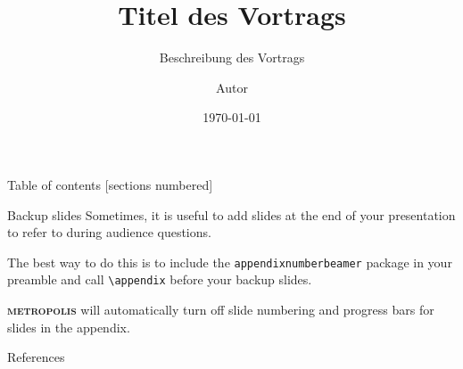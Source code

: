 \documentclass[10pt]{beamer}
\title{Titel des Vortrags}
\subtitle{Beschreibung des Vortrags}
\date{\today}
\author{Autor}
\institute{FabLab Lübeck e.V.}
\newcommand{\themename}{\textbf{\textsc{metropolis}}\xspace}
\begin{document}
\maketitle

\begin{frame}{Table of contents}
  [sections numbered]
  \tableofcontents[hideallsubsections]
\end{frame}









\appendix

\begin{frame}[fragile]{Backup slides}
  Sometimes, it is useful to add slides at the end of your presentation to
  refer to during audience questions.

  The best way to do this is to include the \verb|appendixnumberbeamer|
  package in your preamble and call \verb|\appendix| before your backup slides.

  \themename will automatically turn off slide numbering and progress bars for
  slides in the appendix.
\end{frame}

\begin{frame}[allowframebreaks]{References}

  
  

\end{frame}
\end{document}
